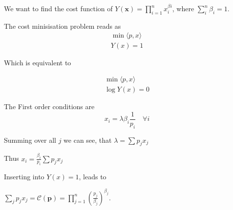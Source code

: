 \documentclass{article}
\begin{document}
    We want to find the cost function of $Y(\mathbf x) = \prod_{i=1}^n x_i^{\beta i}$, where $\sum_i^n \beta_i = 1$.

    The cost minisisation problem reads as 
    \begin{gather}
        \min \langle p,x \rangle \\
        Y(x) = 1
    \end{gather}

Which is equivalent to 

    \begin{gather}
        \min \langle p,x \rangle \\
        \log Y(x) = 0
    \end{gather}

The First order conditions are 
$$x_i = \lambda \beta_i \frac{1}{p_i} \quad \forall i$$

Summing over all $j$ we can see, that 
$ \lambda = \sum p_j x_j$

Thus $x_i = \frac{\beta_i}{p_i}\sum p_j x_j $

Inserting into $Y(x) = 1$, leads to 

$\sum_j p_j x_j = \mathcal C(\mathbf p) = \prod_{j=1}^n  \left( \frac {p_j}{\beta_j} \right)^{\beta_j}.$
\end{document}
